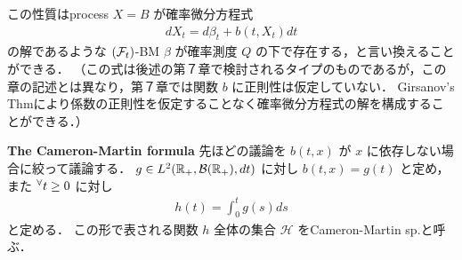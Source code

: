 \documentclass{jsarticle}
\begin{document}
この性質はprocess $X=B$ が確率微分方程式
\begin{align}
    dX_t=d\beta_t+b(t,X_t)dt
\end{align}
の解であるような $(\mathcal{F}_t)$-BM $\beta$ が確率測度 $Q$ の下で存在する，と言い換えることができる．
（この式は後述の第７章で検討されるタイプのものであるが，この章の記述とは異なり，第７章では関数 $b$ に正則性は仮定していない．
Girsanov's Thmにより係数の正則性を仮定することなく確率微分方程式の解を構成することができる．）

\textbf{The Cameron-Martin formula}
先ほどの議論を $b(t,x)$ が $x$ に依存しない場合に絞って議論する．
$g\in L^2(\mathbb{R}_+,\mathcal{B}(\mathbb{R}_+),dt)$ に対し $b(t,x)=g(t)$ と定め，また ${}^{\forall} t\ge0$ に対し
\begin{align}
    h(t)=\int_{0}^{t}g(s)ds
\end{align}
と定める．
この形で表される関数 $h$ 全体の集合 $\mathcal{H}$ をCameron-Martin sp.と呼ぶ．
\end{document}
